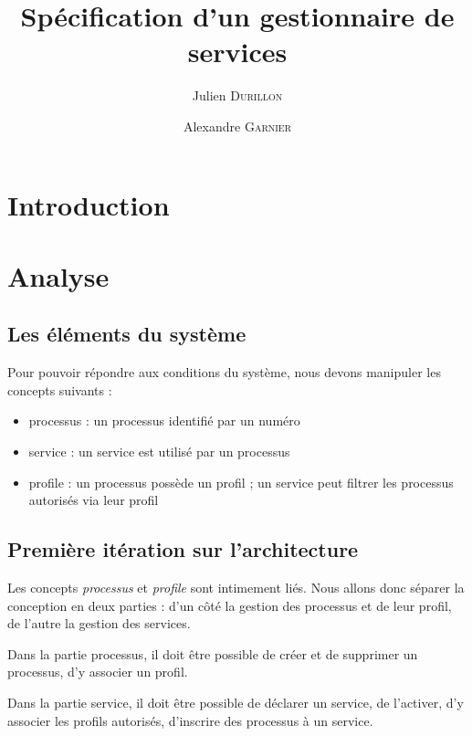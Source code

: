 \documentclass[french, 11pt, a4paper]{article}
\author{Julien \textsc{Durillon} \and Alexandre \textsc{Garnier}}
\title{Spécification d'un gestionnaire de services}
\begin{document}
\maketitle



\section{Introduction}



\section{Analyse}

    \subsection{Les éléments du système}
        Pour pouvoir répondre aux conditions du système, nous devons manipuler les concepts suivants :

        \begin{itemize}
            \item processus : un processus identifié par un numéro
            \item service : un service est utilisé par un processus
            \item profile : un processus possède un profil ; un service peut filtrer les processus autorisés via leur profil
        \end{itemize}


    \subsection{Première itération sur l'architecture}
        Les concepts \emph{processus} et \emph{profile} sont intimement liés.
        Nous allons donc séparer la conception en deux parties : d'un côté la
        gestion des processus et de leur profil, de l'autre la gestion des
        services.

        Dans la partie processus, il doit être possible de créer et de supprimer
        un processus, d'y associer un profil.

        Dans la partie service, il doit être possible de déclarer un service, de
        l'activer, d'y associer les profils autorisés, d'inscrire des processus à un service.
\end{document}
